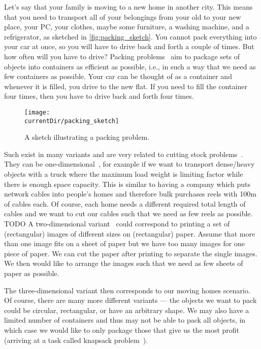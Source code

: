 %
%
Let's say that your family is moving to a new home in another city.
This means that you need to transport all of your belongings from your old to your new place, your PC, your clothes, maybe some furniture, a washing machine, and a refrigerator, as sketched in \autoref{fig:packing_sketch}.
You cannot pack everything into your car at once, so you will have to drive back and forth a couple of times.
But how often will you have to drive?
Packing problems~\cite{S2018ITCAPOPMASM,DF1992CAPIPADATAB} aim to package sets of objects into containers as efficient as possible, i.e., in such a way that we need as few containers as possible.
Your car can be thought of as a container and whenever it is filled, you drive to the new flat.
If you need to fill the container four times, then you have to drive back and forth four times.%
%
\begin{figure}%
\centering%
\texttt{[image: \\currentDir/packing\_sketch]}%
\caption{A sketch illustrating a packing problem.}%
\label{fig:packing_sketch}%
\end{figure}

Such  exist in many variants and are very related to cutting stock problems~\cite{DF1992CAPIPADATAB}.
They can be one-dimensional~\cite{DIM2016BPACSPMMAEA}, for example if we want to transport dense/heavy objects with a truck where the maximum load weight is limiting factor while there is enough space capacity.
This is similar to having a company which puts network cables into people's homes and therefore bulk purchases reels with 100m of cables each.
Of course, each home needs a different required total length of cables and we want to cut our cables such that we need as few reels as possible.
TODO
A two-dimensional variant~\cite{LMM2002TDPPAS} could correspond to printing a set of (rectangular) images of different sizes on (rectangular) paper.
Assume that more than one image fits on a sheet of paper but we have too many images for one piece of paper.
We can cut the paper after printing to separate the single images.
We then would like to arrange the images such that we need as few sheets of paper as possible.

The three-dimensional variant then corresponds to our moving homes scenario.
Of course, there are many more different variants --- the objects we want to pack could be circular, rectangular, or have an arbitrary shape.
We may also have a limited number of containers and thus may not be able to pack all objects, in which case we would like to only package those that give us the most profit (arriving at a task called knapsack problem~\cite{MT1990KPAACI}).%
%
\endhsection%
%
